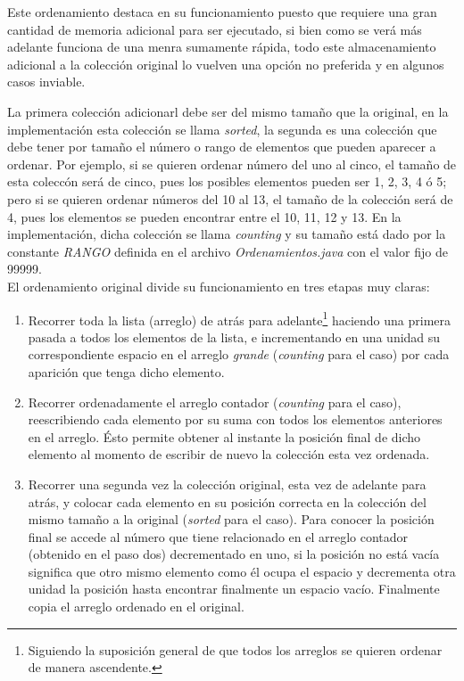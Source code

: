 \documentclass[a4paper,12pt]{article}
\begin{document}
Este ordenamiento destaca en su funcionamiento puesto que requiere una gran cantidad de memoria adicional para ser ejecutado, si bien como se verá más adelante funciona de una menra sumamente rápida, todo este almacenamiento adicional a la colección original lo vuelven una opción no preferida y en algunos casos inviable.

La primera colección adicionarl debe ser del mismo tamaño que la original, en la implementación esta colección se llama \textit{sorted}, la segunda es una colección que debe tener por tamaño el número o rango de elementos que pueden aparecer a ordenar. Por ejemplo, si se quieren ordenar número del uno al cinco, el tamaño de esta coleccón será de cinco, pues los posibles elementos pueden ser 1, 2, 3, 4 ó 5; pero si se quieren ordenar números del 10 al 13, el tamaño de la colección será de 4, pues los elementos se pueden encontrar entre el 10, 11, 12 y 13. En la implementación, dicha colección se llama \textit{counting} y su tamaño está dado por la constante \textit{RANGO} definida en el archivo \textit{Ordenamientos.java} con el valor fijo de 99999.\\

El ordenamiento original divide su funcionamiento en tres etapas muy claras:

\begin{enumerate}
    \item Recorrer toda la lista (arreglo) de atrás para adelante\footnote{Siguiendo la suposición general de que todos los arreglos se quieren ordenar de manera ascendente.} haciendo una primera pasada a todos los elementos de la lista, e incrementando en una unidad su correspondiente espacio en el arreglo \textit{grande} (\textit{counting} para el caso) por cada aparición que tenga dicho elemento.
    
    \item Recorrer ordenadamente el arreglo contador (\textit{counting} para el caso), reescribiendo cada elemento por su suma con todos los elementos anteriores en el arreglo. Ésto permite obtener al instante la posición final de dicho elemento al momento de escribir de nuevo la colección esta vez ordenada.
    
    \item Recorrer una segunda vez la colección original, esta vez de adelante para atrás, y colocar cada elemento en su posición correcta en la colección del mismo tamaño a la original (\textit{sorted} para el caso). Para conocer la posición final se accede al número que tiene relacionado en el arreglo contador (obtenido en el paso dos) decrementado en uno, si la posición no está vacía significa que otro mismo elemento como él ocupa el espacio y decrementa otra unidad la posición hasta encontrar finalmente un espacio vacío. Finalmente copia el arreglo ordenado en el original.
\end{enumerate}
\end{document}
